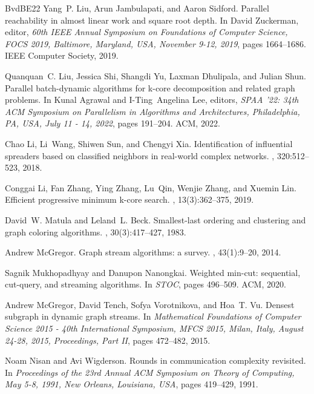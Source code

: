 \documentclass[11pt,letterpaper]{article}
\theoremstyle{definition}
\begin{document}
\begin{thebibliography}{BvdBE{\etalchar{+}}22}
Yang~P. Liu, Arun Jambulapati, and Aaron Sidford.
\newblock Parallel reachability in almost linear work and square root depth.
\newblock In David Zuckerman, editor, {\em 60th {IEEE} Annual Symposium on Foundations of Computer Science, {FOCS} 2019, Baltimore, Maryland, USA, November 9-12, 2019}, pages 1664--1686. {IEEE} Computer Society, 2019.

Quanquan~C. Liu, Jessica Shi, Shangdi Yu, Laxman Dhulipala, and Julian Shun.
\newblock Parallel batch-dynamic algorithms for k-core decomposition and related graph problems.
\newblock In Kunal Agrawal and I{-}Ting~Angelina Lee, editors, {\em {SPAA} '22: 34th {ACM} Symposium on Parallelism in Algorithms and Architectures, Philadelphia, PA, USA, July 11 - 14, 2022}, pages 191--204. {ACM}, 2022.

Chao Li, Li~Wang, Shiwen Sun, and Chengyi Xia.
\newblock Identification of influential spreaders based on classified neighbors in real-world complex networks.
, 320:512--523, 2018.

Conggai Li, Fan Zhang, Ying Zhang, Lu~Qin, Wenjie Zhang, and Xuemin Lin.
\newblock Efficient progressive minimum k-core search.
, 13(3):362--375, 2019.

David~W. Matula and Leland~L. Beck.
\newblock Smallest-last ordering and clustering and graph coloring algorithms.
, 30(3):417--427, 1983.

Andrew McGregor.
\newblock Graph stream algorithms: a survey.
, 43(1):9--20, 2014.

Sagnik Mukhopadhyay and Danupon Nanongkai.
\newblock Weighted min-cut: sequential, cut-query, and streaming algorithms.
\newblock In {\em {STOC}}, pages 496--509. {ACM}, 2020.

Andrew McGregor, David Tench, Sofya Vorotnikova, and Hoa~T. Vu.
\newblock Densest subgraph in dynamic graph streams.
\newblock In {\em Mathematical Foundations of Computer Science 2015 - 40th International Symposium, {MFCS} 2015, Milan, Italy, August 24-28, 2015, Proceedings, Part {II}}, pages 472--482, 2015.

Noam Nisan and Avi Wigderson.
\newblock Rounds in communication complexity revisited.
\newblock In {\em Proceedings of the 23rd Annual {ACM} Symposium on Theory of Computing, May 5-8, 1991, New Orleans, Louisiana, {USA}}, pages 419--429, 1991.


\end{thebibliography}
\end{document}

